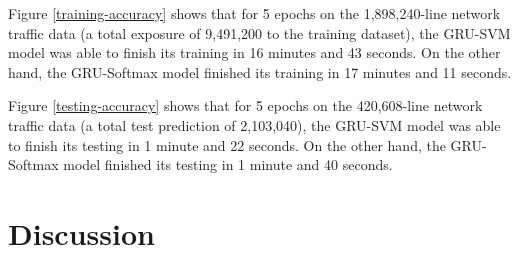 Figure \ref{training-accuracy} shows that for 5 epochs on the 1,898,240-line network traffic data (a total exposure of 9,491,200 to the training dataset), the GRU-SVM model was able to finish its training in 16 minutes and 43 seconds. On the other hand, the GRU-Softmax model finished its training in 17 minutes and 11 seconds.

Figure \ref{testing-accuracy} shows that for 5 epochs on the 420,608-line network traffic data (a total test prediction of 2,103,040), the GRU-SVM model was able to finish its testing in 1 minute and 22 seconds. On the other hand, the GRU-Softmax model finished its testing in 1 minute and 40 seconds.

\section{Discussion}

